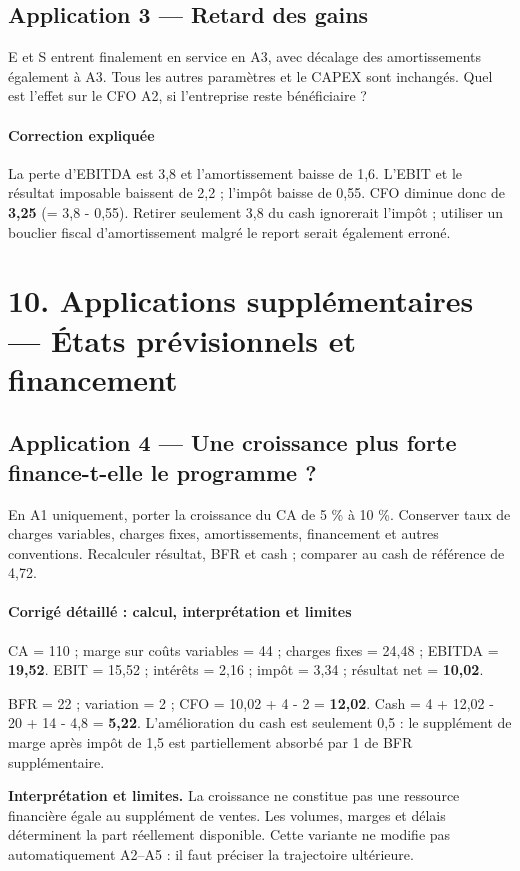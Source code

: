 \documentclass[12pt,a4paper]{article}
\begin{document}
\subsection*{Application 3 --- Retard des gains}
E et S entrent finalement en service en A3, avec décalage des amortissements également à A3. Tous les autres paramètres et le CAPEX sont inchangés. Quel est l’effet sur le CFO A2, si l’entreprise reste bénéficiaire ?


\paragraph{Correction expliquée}
La perte d’EBITDA est 3,8 et l’amortissement baisse de 1,6. L’EBIT et le résultat imposable baissent de 2,2 ; l’impôt baisse de 0,55. CFO diminue donc de \textbf{3,25} (= 3,8 - 0,55). Retirer seulement 3,8 du cash ignorerait l’impôt ; utiliser un bouclier fiscal d’amortissement malgré le report serait également erroné.

\section*{10. Applications supplémentaires --- États prévisionnels et financement}

\subsection*{Application 4 --- Une croissance plus forte finance-t-elle le programme ?}
En A1 uniquement, porter la croissance du CA de 5 \% à 10 \%. Conserver taux de charges variables, charges fixes, amortissements, financement et autres conventions. Recalculer résultat, BFR et cash ; comparer au cash de référence de 4,72.


\paragraph{Corrigé détaillé : calcul, interprétation et limites}
CA = 110 ; marge sur coûts variables = 44 ; charges fixes = 24,48 ; EBITDA = \textbf{19,52}. EBIT = 15,52 ; intérêts = 2,16 ; impôt = 3,34 ; résultat net = \textbf{10,02}.

BFR = 22 ; variation = 2 ; CFO = 10,02 + 4 - 2 = \textbf{12,02}. Cash = 4 + 12,02 - 20 + 14 - 4,8 = \textbf{5,22}. L’amélioration du cash est seulement 0,5 : le supplément de marge après impôt de 1,5 est partiellement absorbé par 1 de BFR supplémentaire.

\textbf{Interprétation et limites.} La croissance ne constitue pas une ressource financière égale au supplément de ventes. Les volumes, marges et délais déterminent la part réellement disponible. Cette variante ne modifie pas automatiquement A2--A5 : il faut préciser la trajectoire ultérieure.
\end{document}
